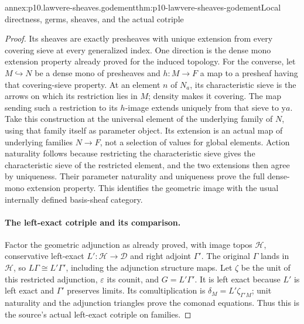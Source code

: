 \begin{annexitem}{annex:p10.lawvere-sheaves.godement}{thm:p10-lawvere-sheaves-godement}{Local directness, germs, sheaves, and the actual cotriple}
\begin{proof}
Its sheaves are exactly presheaves with unique
extension from every covering sieve at every
generalized index.  One direction is the dense
mono extension property already proved for
the induced topology.  For the converse, let
\(M\hookrightarrow N\) be a dense mono of
presheaves and \(h:M\to F\) a map to a presheaf
having that covering-sieve property.  At an
element \(n\) of \(N_a\), its characteristic
sieve is the arrows on which its restriction
lies in \(M\); density makes it covering.
The map sending such a restriction to its
\(h\)-image extends uniquely from that sieve
to \(\mathrm ya\).  Take this construction
at the universal element of the underlying
family of \(N\), using that family itself
as parameter object.  Its extension is an
actual map of underlying families \(N\to F\),
not a selection of values for global elements.
Action naturality follows because restricting
the characteristic sieve gives the characteristic
sieve of the restricted element, and the two
extensions then agree by uniqueness.  Their
parameter naturality and uniqueness prove
the full dense-mono extension property.
This identifies the geometric image with the
usual internally defined basis-sheaf category.

\paragraph{The left-exact cotriple and its comparison.}
Factor the geometric adjunction as already proved,
with image topos \(\mathcal H\), conservative
left-exact \(L':\mathcal H\to\mathcal D\)
and right adjoint \(\Gamma'\).  The original
\(\Gamma\) lands in \(\mathcal H\), so
\(L\Gamma\cong L'\Gamma'\), including the
adjunction structure maps.  Let \(\zeta\)
be the unit of this restricted adjunction,
\(\varepsilon\) its counit, and
\(G=L'\Gamma'\).  It is left exact because
\(L'\) is left exact and \(\Gamma'\) preserves
limits.  Its comultiplication is
\(\delta_M=L'\zeta_{\Gamma'M}\); unit
naturality and the adjunction triangles prove
the comonad equations.  Thus this is the
source's actual left-exact cotriple on families.


\end{proof}
\end{annexitem}
